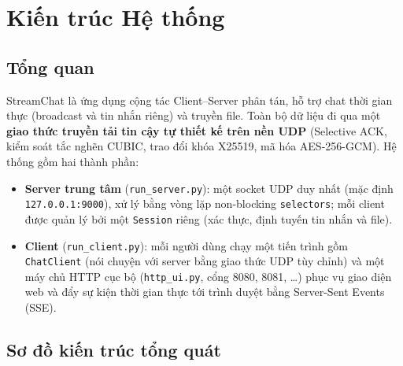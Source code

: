 \section{Kiến trúc Hệ thống}

\subsection{Tổng quan}
StreamChat là ứng dụng cộng tác Client--Server phân tán, hỗ trợ chat thời gian thực (broadcast và tin nhắn riêng) và truyền file. Toàn bộ dữ liệu đi qua một \textbf{giao thức truyền tải tin cậy tự thiết kế trên nền UDP} (Selective ACK, kiểm soát tắc nghẽn CUBIC, trao đổi khóa X25519, mã hóa AES-256-GCM). Hệ thống gồm hai thành phần:
\begin{itemize}
    \item \textbf{Server trung tâm} (\texttt{run\_server.py}): một socket UDP duy nhất (mặc định \texttt{127.0.0.1:9000}), xử lý bằng vòng lặp non-blocking \texttt{selectors}; mỗi client được quản lý bởi một \texttt{Session} riêng (xác thực, định tuyến tin nhắn và file).
    \item \textbf{Client} (\texttt{run\_client.py}): mỗi người dùng chạy một tiến trình gồm \texttt{ChatClient} (nói chuyện với server bằng giao thức UDP tùy chỉnh) và một máy chủ HTTP cục bộ (\texttt{http\_ui.py}, cổng 8080, 8081, \ldots) phục vụ giao diện web và đẩy sự kiện thời gian thực tới trình duyệt bằng Server-Sent Events (SSE).
\end{itemize}

\subsection{Sơ đồ kiến trúc tổng quát}

